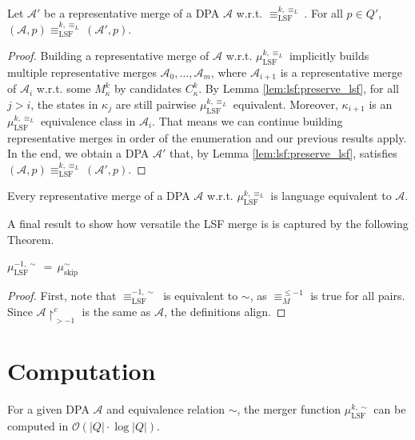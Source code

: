 \begin{theorem}
	Let $\mathcal{A}'$ be a representative merge of a DPA $\mathcal{A}$ w.r.t. $\equiv_\text{LSF}^{k,\equiv_L}$. For all $p \in Q'$, $(\mathcal{A}, p) \equiv_\text{LSF}^{k,\equiv_L} (\mathcal{A}', p)$.
\end{theorem}

\begin{proof}
		Building a representative merge of $\mathcal{A}$ w.r.t. $\mu_\text{LSF}^{k,\equiv_L}$ implicitly builds multiple representative merges $\mathcal{A}_0, \dots, \mathcal{A}_m$, where $\mathcal{A}_{i+1}$ is a representative merge of $\mathcal{A}_i$ w.r.t. some $M^k_\kappa$ by candidates $C^k_\kappa$. By Lemma \ref{lem:lsf:preserve_lsf}, for all $j > i$, the states in $\kappa_j$ are still pairwise $\mu_\text{LSF}^{k,\equiv_L}$ equivalent. Moreover, $\kappa_{i+1}$ is an $\mu_\text{LSF}^{k,\equiv_L}$ equivalence class in $\mathcal{A}_i$. That means we can continue building representative merges in order of the enumeration and our previous results apply. In the end, we obtain a DPA $\mathcal{A}'$ that, by Lemma \ref{lem:lsf:preserve_lsf}, satisfies $(\mathcal{A}, p) \equiv_\text{LSF}^{k,\equiv_L} (\mathcal{A}', p)$.
\end{proof}

\begin{cor}
	Every representative merge of a DPA $\mathcal{A}$ w.r.t. $\mu_\text{LSF}^{k,\equiv_L}$ is language equivalent to $\mathcal{A}$.
\end{cor}

\vspace{10pt}

A final result to show how versatile the LSF merge is is captured by the following Theorem.

\begin{theorem}
	$\mu_\text{LSF}^{-1,\sim} \,=\, \mu_\text{skip}^\sim$
\end{theorem}

\begin{proof}
	First, note that $\equiv_\text{LSF}^{-1,\sim}$ is equivalent to $\sim$, as $\equiv_M^{\leq -1}$ is true for all pairs. Since $\mathcal{A} \upharpoonright^c_{> -1}$ is the same as $\mathcal{A}$, the definitions align.
\end{proof}


\section{Computation}
\begin{lem}
	For a given DPA $\mathcal{A}$ and equivalence relation $\sim$, the merger function $\mu_\text{LSF}^{k,\sim}$ can be computed in $\mathcal{O}(|Q| \cdot \log |Q|)$.
\end{lem}

